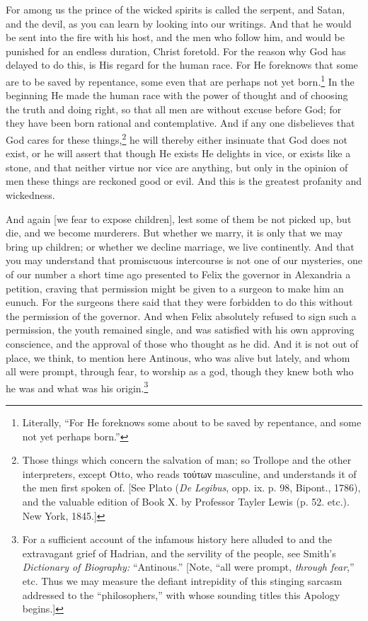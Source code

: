For among us the prince of the wicked spirits is called the serpent, and Satan, and the devil, as you can learn by looking into our writings. And that he would be sent into the fire with his host, and the men who follow him, and would be punished for an endless duration, Christ foretold. For the reason why God has delayed to do this, is His regard for the human race. For He foreknows that some are to be saved by repentance, some even that are perhaps not yet born.\footnote{Literally, “For He foreknows some about to be saved by repentance, and some not yet perhaps born.”} In the beginning He made the human race with the power of thought and of choosing the truth and doing right, so that all men are without excuse before God; for they have been born rational and contemplative. And if any one disbelieves that God cares for these things,\footnote{Those things which concern the salvation of man; so Trollope and the other interpreters, except Otto, who reads \textgreek{τούτων} masculine, and understands it of the men first spoken of. [See Plato (\emph{De Legibus}, opp. ix. p. 98, Bipont., 1786), and the valuable edition of Book X. by Professor Tayler Lewis (p. 52. etc.). New York, 1845.]} he will thereby either insinuate that God does not exist, or he will assert that though He exists He delights in vice, or exists like a stone, and that neither virtue nor vice are anything, but only in the opinion of men these things are reckoned good or evil. And this is the greatest profanity and wickedness.


And again [we fear to expose children], lest some of them be not picked up, but die, and we become murderers. But whether we marry, it is only that we may bring up children; or whether we decline marriage, we live continently. And that you may understand that promiscuous intercourse is not one of our mysteries, one of our number a short time ago presented to Felix the governor in Alexandria a petition, craving that permission might be given to a surgeon to make him an eunuch. For the surgeons there said that they were forbidden to do this without the permission of the governor. And when Felix absolutely refused to sign such a permission, the youth remained single, and was satisfied with his own approving conscience, and the approval of those who thought as he did. And it is not out of place, we think, to mention here Antinous, who was alive but lately, and whom all were prompt, through fear, to worship as a god, though they knew both who he was and what was his origin.\footnote{For a sufficient account of the infamous history here alluded to and the extravagant grief of Hadrian, and the servility of the people, see Smith’s \emph{Dictionary of Biography:} “Antinous.” [Note, “all were prompt, \emph{through fear},” etc. Thus we may measure the defiant intrepidity of this stinging sarcasm addressed to the “philosophers,” with whose sounding titles this Apology begins.]}

